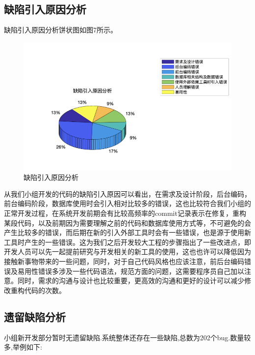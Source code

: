\documentclass[hyperref, a4paper]{ctexart}
\begin{document}
\hypertarget{ux7f3aux9677ux5f15ux5165ux539fux56e0ux5206ux6790}{%
\subsection{缺陷引入原因分析}\label{ux7f3aux9677ux5f15ux5165ux539fux56e0ux5206ux6790}}

缺陷引入原因分析饼状图如图7所示。

\begin{figure}
\centering
\includegraphics{pic/WechatIMG19681.png}
\caption{缺陷引入原因分析}
\end{figure}

从我们小组开发的代码的缺陷引入原因可以看出，在需求及设计阶段，后台编码，前台编码阶段，数据库使用时会引入相对比较多的错误，这也比较符合我们小组的正常开发过程，在系统开发前期会有比较高频率的commit记录表示在修复，重构某段代码，以及前期因为需要理解之前的代码和数据库使用方式等，不可避免的会产生比较多的错误，而后期在新的引入外部工具时会有一些错误，也是源于使用新工具时产生的一些错误。这为我们之后开发较大工程的步骤指出了一些改进点，即开发人员可以先一起提前研究与开发相关的新工具的使用，这也也许可以降低因为接触新事物带来的一些问题，同时，对于自己代码风格也应该注意，前后台编码错误及易用性错误多涉及一些代码语法，规范方面的问题，这需要程序员自己加以注意。同时，需求的沟通与设计也比较重要，更高效的沟通和更好的设计可以减少修改重构代码的次数。

\hypertarget{ux9057ux7559ux7f3aux9677ux5206ux6790}{%
\subsection{遗留缺陷分析}\label{ux9057ux7559ux7f3aux9677ux5206ux6790}}

小组新开发部分暂时无遗留缺陷.系统整体还存在一些缺陷,总数为202个bug.数量较多,举例如下:
\end{document}
